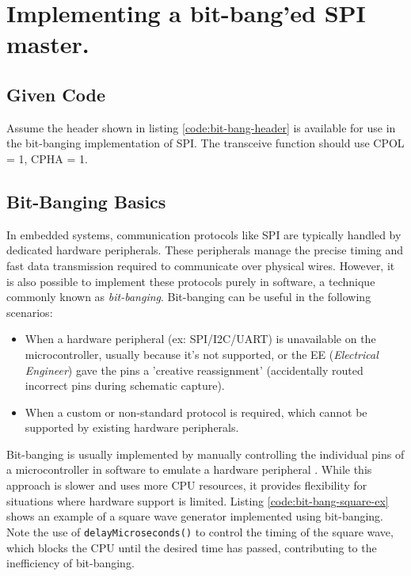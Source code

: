 \documentclass[main.tex]{subfiles}
\begin{document}
\section{Implementing a bit-bang'ed SPI master.}

\subsection{Given Code}
Assume the header shown in listing \ref{code:bit-bang-header} is available for use in the bit-banging implementation of SPI. The transceive function should use CPOL = 1, CPHA = 1. 



\spoilerline

\subsection{Bit-Banging Basics}
In embedded systems, communication protocols like SPI are typically handled by dedicated hardware peripherals. These peripherals manage the precise timing and fast data transmission required to communicate over physical wires. However, it is also possible to implement these protocols purely in software, a technique commonly known as \textit{bit-banging}. Bit-banging can be useful in the following scenarios:
\begin{itemize}
    \item When a hardware peripheral (ex: SPI/I2C/UART) is unavailable on the microcontroller, usually because it's not supported, or the EE (\textit{Electrical Engineer}) gave the pins a 'creative reassignment' (accidentally routed incorrect pins during schematic capture).
    \item When a custom or non-standard protocol is required, which cannot be supported by existing hardware peripherals.
\end{itemize}

\noindent Bit-banging is usually implemented by manually controlling the individual pins of a microcontroller in software to emulate a hardware peripheral \cite{looi_bitbanging}. While this approach is slower and uses more CPU resources, it provides flexibility for situations where hardware support is limited. Listing \ref{code:bit-bang-square-ex} shows an example of a square wave generator implemented using bit-banging. Note the use of \texttt{delayMicroseconds()} to control the timing of the square wave, which blocks the CPU until the desired time has passed, contributing to the inefficiency of bit-banging.
\end{document}
